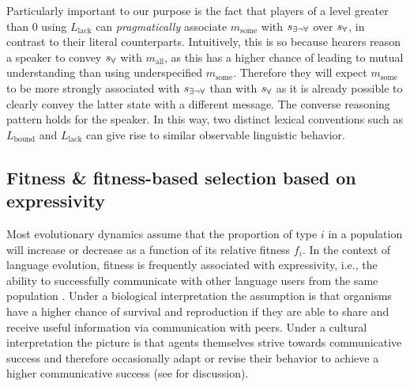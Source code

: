 \documentclass[a4paper]{article}
\newcommand{\state}{\ensuremath{s}\xspace}		%
\newcommand{\mystate}[1]{\ensuremath{\state_{\text{#1}}}\xspace} %
\newcommand{\mylang}[1]{\ensuremath{L_{\text{#1}}}\xspace} %
\newcommand{\messg}{\ensuremath{m}\xspace}		%
\newcommand{\mymessg}[1]{\ensuremath{\messg_{\text{#1}}}\xspace} %
\newcommand{\ssome}{\mystate{\ensuremath{\exists\neg\forall}}}
\newcommand{\sall}{\mystate{\ensuremath{\forall}}}
\newcommand{\msome}{\mymessg{some}}
\newcommand{\mall}{\mymessg{all}}
\newcommand{\Lbound}{\mylang{bound}}
\newcommand{\Llack}{\mylang{lack}}
\begin{document}
Particularly important to our purpose is the fact that players of a level greater than $0$ using $\Llack$ can {\em pragmatically} associate $\msome$ with $\ssome$ over $\sall$,  in contrast to their literal counterparts. Intuitively, this is so because hearers reason a speaker to convey $\sall$ with $\mall$, as this has a higher chance of leading to mutual understanding than using underspecified $\msome$. Therefore they will expect $\msome$ to be more strongly associated with $\ssome$ than with $\sall$ as it is already possible to clearly convey the latter state with a different message. The converse reasoning pattern holds for the speaker. In this way, two distinct lexical conventions such as $\Lbound$ and $\Llack$ can give rise to similar observable linguistic behavior.

\subsection{Fitness \& fitness-based selection based on expressivity}\label{sec:expressivity}

Most evolutionary dynamics assume that the proportion of type $i$ in a population will increase
or decrease as a function of its relative fitness $f_i$. In the context of language evolution,
fitness is frequently associated with expressivity, i.e., the ability to successfully
communicate with other language users from the same population
\citep[e.g.,][]{nowak+krakauer:1999,nowak+etal:2000, nowak+etal:2002}. Under a biological
interpretation the assumption is that organisms have a higher chance of survival and
reproduction if they are able to share and receive useful information via communication with
peers. Under a cultural interpretation the picture is that agents themselves strive towards
communicative success and therefore occasionally adapt or revise their behavior to achieve a
higher communicative success (see \citealt[\S3.3]{benz+etal:2005b} for discussion).
\end{document}
